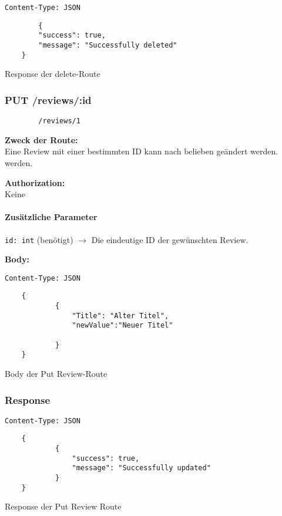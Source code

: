 \begin{code}
    \lstinline{Content-Type: JSON}
    \begin{lstlisting}
        {
        "success": true,
        "message": "Successfully deleted"
    }
    \end{lstlisting}
    \caption{Response der delete-Route}
\end{code}

\pagebreak


\subsubsection{PUT /reviews/:id}

\begin{lstlisting}
        /reviews/1
    \end{lstlisting}


\textbf{Zweck der Route:} \\
Eine Review mit einer bestimmten ID kann nach belieben geändert werden.
werden.

\textbf{Authorization:} \\
Keine

\paragraph{Zusätzliche Parameter}
\lstinline{id: int} (benötigt)
$\rightarrow$ Die eindeutige ID der gewünschten Review.

\textbf{Body:}\\
\begin{code}
    \lstinline{Content-Type: JSON}
    \begin{lstlisting}
    {
            {
                "Title": "Alter Titel",
                "newValue":"Neuer Titel"
    
            }
    }
    \end{lstlisting}
    \caption{Body der Put Review-Route}
\end{code}

\subsubsection{Response}
\begin{code}
    \lstinline{Content-Type: JSON}
    \begin{lstlisting}
    {
            {
                "success": true,
                "message": "Successfully updated"
            }
    }
    \end{lstlisting}
    \caption{Response der Put Review Route}
\end{code}


\pagebreak

